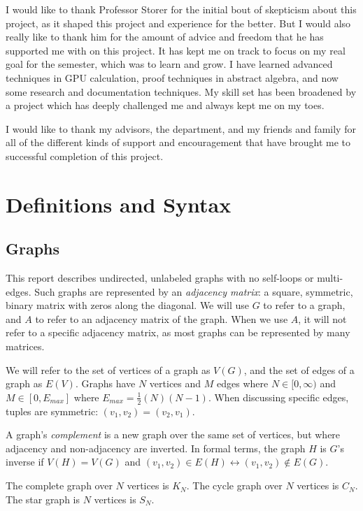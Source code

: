 \documentclass[11pt,a4paper]{report}
\begin{document}
I would like to thank Professor Storer for the initial bout of skepticism about this project, as it shaped this project and experience for the better.
But I would also really like to thank him for the amount of advice and freedom that he has supported me with on this project.
It has kept me on track to focus on my real goal for the semester, which was to learn and grow.
I have learned advanced techniques in GPU calculation, proof techniques in abstract algebra, and now some research and documentation techniques.
My skill set has been broadened by a project which has deeply challenged me and always kept me on my toes.

I would like to thank my advisors, the department, and my friends and family for all of the different kinds of support and encouragement that have brought me to successful completion of this project.

\chapter{Definitions and Syntax}


\section{Graphs}
This report describes undirected, unlabeled graphs with no self-loops or multi-edges.
Such graphs are represented by an \emph{adjacency matrix}: a square, symmetric, binary matrix with zeros along the diagonal.
We will use $G$ to refer to a graph, and $A$ to refer to an adjacency matrix of the graph.
When we use $A$, it will not refer to a specific adjacency matrix, as most graphs can be represented by many matrices.

We will refer to the set of vertices of a graph as $V(G)$, and the set of edges of a graph as $E(V)$.
Graphs have $N$ vertices and $M$ edges where $N \in [0, \infty)$ and $M \in [0, E_{max}]$ where ${E_{max}} = \frac{1}{2}(N)(N-1)$.
When discussing specific edges, tuples are symmetric: $(v_1, v_2) = (v_2, v_1)$.

A graph's \emph{complement} is a new graph over the same set of vertices, but where adjacency and non-adjacency are inverted.
In formal terms, the graph $H$ is $G$'s inverse if $V(H) = V(G)$ and $(v_1, v_2) \in E(H) \leftrightarrow (v_1, v_2) \notin E(G)$.

The complete graph over $N$ vertices is $K_N$. 
The cycle graph over $N$ vertices is $C_N$.
The star graph is $N$ vertices is $S_N$.
\end{document}
